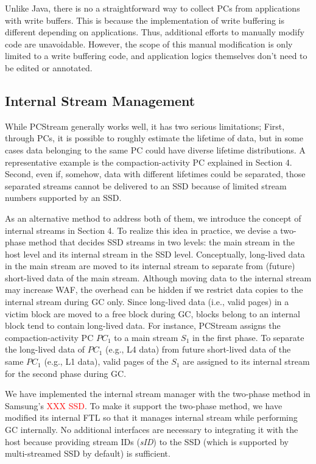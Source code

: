 Unlike Java, there is no a straightforward way to collect PCs from applications
with write buffers. This is because the implementation of write buffering is
different depending on applications. Thus, additional efforts to manually
modify code are unavoidable. However, the scope of this manual modification is
only limited to a write buffering code, and application logics themselves don't
need to be edited or annotated.

\subsection{Internal Stream Management}
While \textsf{PCStream} generally works well, it has two serious limitations;
First, through PCs, it is possible to roughly estimate the lifetime of data,
but in some cases data belonging to the same PC could have diverse lifetime
distributions.  A representative example is the compaction-activity PC
explained in Section 4. Second, even if, somehow, data with different lifetimes
could be separated, those separated streams cannot be delivered to an SSD
because of limited stream numbers supported by an SSD.

As an alternative method to address both of them, we introduce the concept of
internal streams in Section 4. To realize this idea in practice, we devise a
two-phase method that decides SSD streams in two levels: the main stream in the
host level and its internal stream in the SSD level.  Conceptually, long-lived
data in the main stream are moved to its internal stream to separate from
(future) short-lived data of the main stream.  Although moving data to the
internal stream may increase WAF, the overhead can be hidden if we restrict
data copies to the internal stream during GC only.  Since long-lived data
(i.e., valid pages) in a victim block are moved to a free block during GC,
blocks belong to an internal block tend to contain long-lived data.  For
instance, \textsf{\small PCStream} assigns the compaction-activity PC {\it
$PC_1$} to a main stream {\it $S_1$} in the first phase.  To separate the
long-lived data of {\it $PC_1$} (e.g., L4 data) from future short-lived data of
the same {\it $PC_1$} (e.g., L1 data), valid pages of the {\it $S_1$} are
assigned to its internal stream for the second phase during GC.

{\color{blue}
We have implemented the internal stream manager with the two-phase method in
Samsung's \textcolor{red}{XXX SSD}. To make it support the two-phase method, we
have modified its internal FTL so that it manages internal stream while
performing GC internally. No additional interfaces are necessary to integrating
it with the host because providing stream IDs (\textit{sID}) to the SSD (which
is supported by multi-streamed SSD by default) is sufficient.
}

